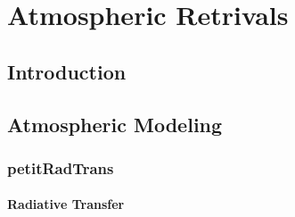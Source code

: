 \chapter{Atmospheric Retrivals}
\cite{Schlawin2018} %
\cite{Madhusudhan2018} %
\cite{Fisher2019} %
\cite{Oreshenko2019}%
\cite{Barman2015} %
\cite{Benneke2013} %
\cite{Benneke2012} %
\cite{Blanco-Cuaresma2018} %
\cite{Konopacky2013} %
\cite{Morley2018} %
\cite{Lupu2018} %
\cite{Gandhi2018} %
\cite{Baudino2017} %
\cite{Line2013} %
\cite{Madhusudhan2018b} %
\cite{Irwin2008} %
\cite{Robinson2016} %
\cite{Waldmann2015} %
\cite{Waldmann2015a} %
\cite{Line2015,Line2017,Zalesky2019} %

\section{Introduction}
\cite{Batalha2018}%
\cite{Feng2018} %
\cite{Molliere2019}%
\section{Atmospheric Modeling}
\cite{Behmard2019}%
\cite{Guillot2010} %
\cite{Chen2019} %
\cite{Molliere2015} %

\cite{Zhang2019} %
\subsection{petitRadTrans}
\cite{Molliere2019} %
\subsubsection{Radiative Transfer}
